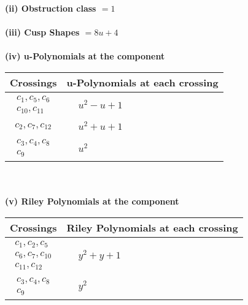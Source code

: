 \documentclass[1p]{elsarticle_modified}
\theoremstyle{definition}
\begin{document}
\flushleft \textbf{(ii) Obstruction class $= 1$}\\~\\
\flushleft \textbf{(iii) Cusp Shapes $= 8 u+4$}\\~\\
\newpage\renewcommand{\arraystretch}{1}
\flushleft \textbf{(iv) u-Polynomials at the component}\newline \\
\begin{tabular}{m{50pt}|m{274pt}}
Crossings & \hspace{64pt}u-Polynomials at each crossing \\
\hline $$\begin{aligned}c_{1},c_{5},c_{6}\\c_{10},c_{11}\end{aligned}$$&$\begin{aligned}
&u^2- u+1
\end{aligned}$\\
\hline $$\begin{aligned}c_{2},c_{7},c_{12}\end{aligned}$$&$\begin{aligned}
&u^2+u+1
\end{aligned}$\\
\hline $$\begin{aligned}c_{3},c_{4},c_{8}\\c_{9}\end{aligned}$$&$\begin{aligned}
&u^2
\end{aligned}$\\
\hline
\end{tabular}\\~\\
\newpage\renewcommand{\arraystretch}{1}
\flushleft \textbf{(v) Riley Polynomials at the component}\newline \\
\begin{tabular}{m{50pt}|m{274pt}}
Crossings & \hspace{64pt}Riley Polynomials at each crossing \\
\hline $$\begin{aligned}c_{1},c_{2},c_{5}\\c_{6},c_{7},c_{10}\\c_{11},c_{12}\end{aligned}$$&$\begin{aligned}
&y^2+y+1
\end{aligned}$\\
\hline $$\begin{aligned}c_{3},c_{4},c_{8}\\c_{9}\end{aligned}$$&$\begin{aligned}
&y^2
\end{aligned}$\\
\hline
\end{tabular}\\~\\
\end{document}
